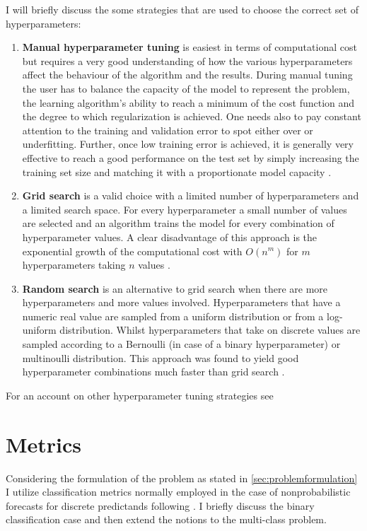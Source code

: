 I will briefly discuss the some strategies that are used to choose the correct set of hyperparameters:

\begin{enumerate}
    \item \textbf{Manual hyperparameter tuning} is easiest in terms of computational cost but requires a very good understanding of how the various hyperparameters affect the behaviour of the algorithm and the results. During manual tuning the user has to balance the capacity of the model to represent the problem, the learning algorithm's ability to reach a minimum of the cost function and the degree to which regularization is achieved. One needs also to pay constant attention to the training and validation error to spot either over or underfitting. Further, once low training error is achieved, it is generally very effective to reach a good performance on the test set by simply increasing the training set size and matching it with a proportionate model capacity \citep{Goodfellow2016}.
    \item \textbf{Grid search} is a valid choice with a limited number of hyperparameters and a limited search space. For every hyperparameter a small number of values are selected and an algorithm trains the model for every combination of hyperparameter values. A clear disadvantage of this approach is the exponential growth of the computational cost with $O(n^m)$ for $m$ hyperparameters taking $n$ values \citep{Goodfellow2016}.
    \item \textbf{Random search} is an alternative to grid search when there are more hyperparameters and more values involved. Hyperparameters that have a numeric real value are sampled from a uniform distribution or from a log-uniform distribution. Whilst hyperparameters that take on discrete values are sampled according to a Bernoulli (in case of a binary hyperparameter) or multinoulli distribution. This approach was found to yield good hyperparameter combinations much faster than grid search \citep{Bergstra2012RandomOptimization,Goodfellow2016}.

\end{enumerate}
For an account on other hyperparameter tuning strategies see \citet{Bergstra2011AlgorithmsOptimization}

\section{Metrics} \label{sec:metrics}
Considering the formulation of the problem as stated in \cref{sec:problemformulation} I utilize classification metrics normally employed in the case of nonprobabilistic forecasts for discrete predictands following \citet{Wilks2011Statistics}. I briefly discuss the binary classification case and then extend the notions to the multi-class problem.

